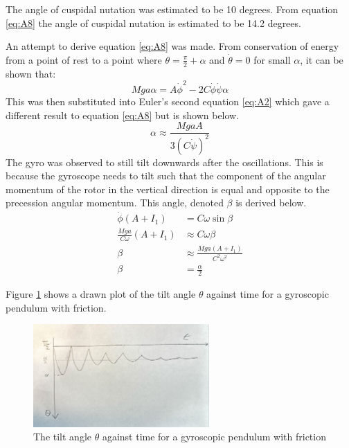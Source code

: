 \documentclass[8pt]{article}
\begin{document}
The angle of cuspidal nutation was estimated to be 10 degrees.
From equation \ref{eq:A8} the angle of cuspidal nutation is estimated to be 14.2 degrees.

An attempt to derive equation \ref{eq:A8} was made. From conservation of energy from a point of rest to a point where $\theta = \frac{\pi}{2} + \alpha$ and $\dot{\theta} = 0$ for small $\alpha$, it can be shown that:
\begin{equation}
    Mga \alpha = A \dot{\phi}^2 - 2C\dot{\phi}\dot{\psi}\alpha
\end{equation}
This was then substituted into Euler's second equation \ref{eq:A2} which gave a different result to equation \ref{eq:A8} but is shown below.
\begin{equation}
    \alpha \approx \frac{MgaA}{3(C\dot{\psi})^2}
\end{equation}
The gyro was observed to still tilt downwards after the oscillations.
This is because the gyroscope needs to tilt such that the component
of the angular momentum of the rotor in the vertical direction is equal and
opposite to the precession angular momentum.
This angle, denoted $\beta$ is derived below.
\begin{align}
    \dot{\phi}(A+I_1) &= C \omega \sin \beta \\
    \frac{Mga}{C\omega}(A + I_1) &\approx C\omega \beta \\
    \beta &\approx \frac{Mga(A + I_1)}{C^2\omega^2} \\
    \beta &= \frac{\alpha}{2}
\end{align}

Figure \ref{fig:tilt_angle} shows a drawn plot of the tilt angle $\theta$ against time for a gyroscopic pendulum with friction.

\begin{figure}
    \centering
    \includegraphics[width=0.6\textwidth]{cuspidal_decay.jpg}
    \caption{The tilt angle $\theta$ against time for a gyroscopic pendulum with friction}
    \label{fig:tilt_angle}
\end{figure}
\end{document}
